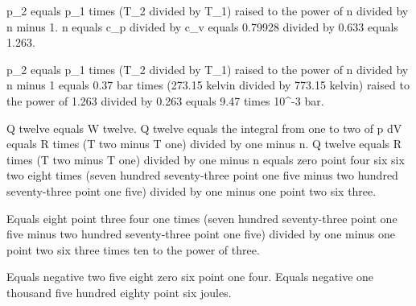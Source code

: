 p_2 equals p_1 times (T_2 divided by T_1) raised to the power of n divided by n minus 1.  
n equals c_p divided by c_v equals 0.79928 divided by 0.633 equals 1.263.  

p_2 equals p_1 times (T_2 divided by T_1) raised to the power of n divided by n minus 1 equals 0.37 bar times (273.15 kelvin divided by 773.15 kelvin) raised to the power of 1.263 divided by 0.263 equals 9.47 times 10^-3 bar.

Q twelve equals W twelve.  
Q twelve equals the integral from one to two of p dV equals R times (T two minus T one) divided by one minus n.  
Q twelve equals R times (T two minus T one) divided by one minus n equals zero point four six six two eight times (seven hundred seventy-three point one five minus two hundred seventy-three point one five) divided by one minus one point two six three.  

Equals eight point three four one times (seven hundred seventy-three point one five minus two hundred seventy-three point one five) divided by one minus one point two six three times ten to the power of three.  

Equals negative two five eight zero six point one four.  
Equals negative one thousand five hundred eighty point six joules.
